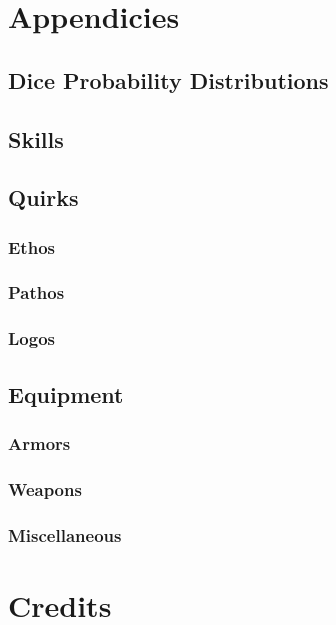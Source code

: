 \documentclass[oneside]{book}
\begin{document}
    \part{Appendicies}
    \begin{appendices}
        \chapter{Dice Probability Distributions}

        \chapter{Skills}

        \chapter{Quirks}
            \section{Ethos}
            \section{Pathos}
            \section{Logos}

        \chapter{Equipment}
            \section{Armors}
            \section{Weapons}
            \section{Miscellaneous}

    \end{appendices}

    \part{Credits}
    
\end{document}
